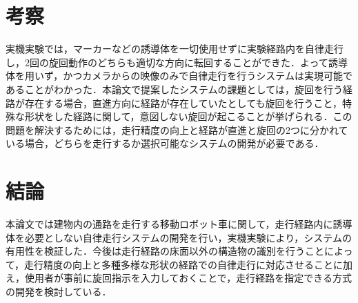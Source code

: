 \documentclass[luatex,fleqn,twocolumn,twoside]{ltjarticle}
\begin{document}
\section{\large 考察}

実機実験では，マーカーなどの誘導体を一切使用せずに実験経路内を自律走行し，2回の旋回動作のどちらも適切な方向に転回することができた．よって誘導体を用いず，かつカメラからの映像のみで自律走行を行うシステムは実現可能であることがわかった．本論文で提案したシステムの課題としては，旋回を行う経路が存在する場合，直進方向に経路が存在していたとしても旋回を行うこと，特殊な形状をした経路に関して，意図しない旋回が起こることが挙げられる．この問題を解決するためには，走行精度の向上と経路が直進と旋回の2つに分かれている場合，どちらを走行するか選択可能なシステムの開発が必要である．

\section{\large 結論}

本論文では建物内の通路を走行する移動ロボット車に関して，走行経路内に誘導体を必要としない自律走行システムの開発を行い，実機実験により，システムの有用性を検証した．今後は走行経路の床面以外の構造物の識別を行うことによって，走行精度の向上と多種多様な形状の経路での自律走行に対応させることに加え，使用者が事前に旋回指示を入力しておくことで，走行経路を指定できる方式の開発を検討している．
\end{document}
